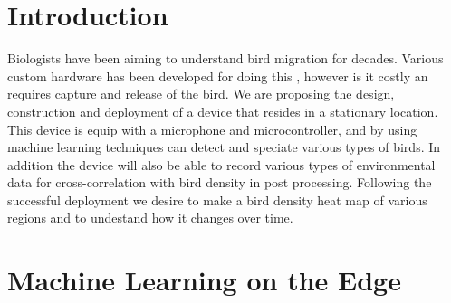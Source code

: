 \documentclass{article}
\begin{document}
\tableofcontents
\newpage

\listoffigures
\newpage

\section{Introduction}
Biologists have been aiming to understand bird migration for decades. Various custom hardware has been developed for doing this \cite{BirdTracking}, however is it costly an requires capture and release of the bird. We are proposing the design, construction and deployment of a device that resides in a stationary location. This device is equip with a microphone and microcontroller, and by using machine learning techniques \cite{ML1} \cite{ML2} can detect and speciate various types of birds. In addition the device will also be able to record various types of environmental data for cross-correlation with bird density in post processing. Following the successful deployment we desire to make a bird density heat map of various regions and to undestand how it changes over time.

\section{Machine Learning on the Edge}
\begin{center}
\end{center}
\end{document}
